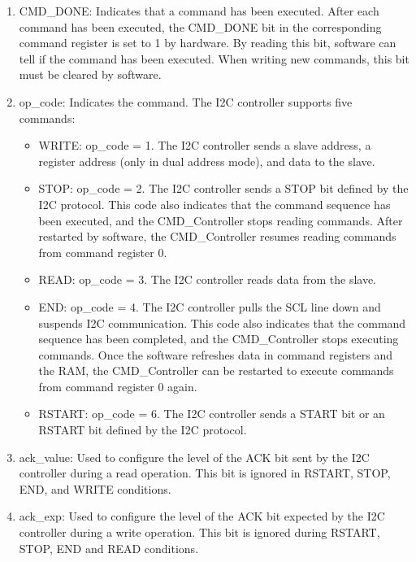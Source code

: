 \documentclass[main\_\_EN.tex]{subfiles}
\begin{document}
\begin{enumerate}

\item CMD\_DONE: Indicates that a command has been executed. After each command has been executed, the CMD\_DONE bit in the corresponding command register is set to 1 by hardware. By reading this bit, software can tell if the command has been executed. When writing new commands, this bit must be cleared by software.

\item op\_code: Indicates the command. The I2C controller supports five commands:

\begin{itemize}

    \item WRITE: op\_code = 1. The I2C controller sends a slave address, a register address  (only in dual address mode), and data to the slave.
    
    \item STOP: op\_code = 2. The I2C controller sends a STOP bit defined by the I2C protocol. This code also indicates that the command sequence has been executed, and the CMD\_Controller stops reading commands. After restarted by software, the CMD\_Controller resumes reading commands from command register 0.
    
    \item READ: op\_code = 3. The I2C controller reads data from the slave.
    
    \item END: op\_code = 4. The I2C controller pulls the SCL line down and suspends I2C communication. This code also indicates that the command sequence has been completed, and the CMD\_Controller stops executing commands. Once the software refreshes data in command registers and the RAM, the CMD\_Controller can be restarted to execute commands from command register 0 again. 

    \item RSTART: op\_code = 6. The I2C controller sends a START bit or an RSTART bit defined by the I2C protocol.
    
\end{itemize}

\item ack\_value: Used to configure the level of the ACK bit sent by the I2C controller during a read operation. This bit is ignored in RSTART, STOP, END, and WRITE conditions.

\item ack\_exp: Used to configure the level of the ACK bit expected by the I2C controller during a write operation. This bit is ignored during RSTART, STOP, END and READ conditions.


\end{enumerate}
\end{document}
